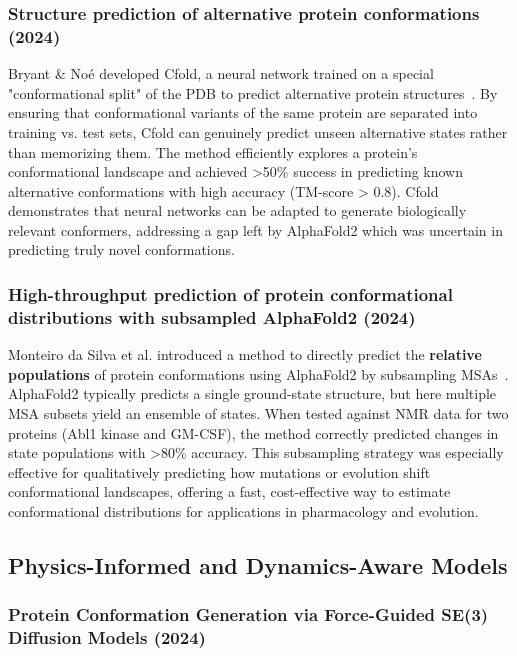 \subsubsection{Structure prediction of alternative protein conformations (2024)}

Bryant \& Noé developed Cfold, a neural network trained on a special "conformational split" of the PDB to predict alternative protein structures~\cite{Bryant2024Cfold}.
By ensuring that conformational variants of the same protein are separated into training vs.
test sets, Cfold can genuinely predict unseen alternative states rather than memorizing them.
The method efficiently explores a protein's conformational landscape and achieved >50\% success in predicting known alternative conformations with high accuracy (TM-score > 0.8).
Cfold demonstrates that neural networks can be adapted to generate biologically relevant conformers, addressing a gap left by AlphaFold2 which was uncertain in predicting truly novel conformations.

\subsubsection{High-throughput prediction of protein conformational distributions with subsampled AlphaFold2 (2024)}

Monteiro da Silva et al.
introduced a method to directly predict the \textbf{relative populations} of protein conformations using AlphaFold2 by subsampling MSAs~\cite{MonteiroSilva2024SubsampledAF2}.
AlphaFold2 typically predicts a single ground-state structure, but here multiple MSA subsets yield an ensemble of states.
When tested against NMR data for two proteins (Abl1 kinase and GM-CSF), the method correctly predicted changes in state populations with >80\% accuracy.
This subsampling strategy was especially effective for qualitatively predicting how mutations or evolution shift conformational landscapes, offering a fast, cost-effective way to estimate conformational distributions for applications in pharmacology and evolution.

\subsection{Physics-Informed and Dynamics-Aware Models}

\subsubsection{Protein Conformation Generation via Force-Guided SE(3) Diffusion Models (2024)}

